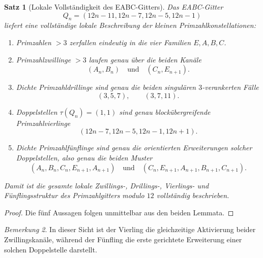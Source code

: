 \documentclass[11pt,a4paper]{article}
\newtheorem{satz}{Satz}
\theoremstyle{definition}
\theoremstyle{remark}
\newtheorem{bemerkung}[satz]{Bemerkung}
\begin{document}
	\begin{satz}[Lokale Vollständigkeit des EABC-Gitters]
		Das EABC-Gitter
		\[
		Q_n=(12n-11,12n-7,12n-5,12n-1)
		\]
		liefert eine vollständige lokale Beschreibung der kleinen Primzahlkonstellationen:
		
		\begin{enumerate}[label=\textup{(\roman*)}]
			\item Primzahlen \(>3\) zerfallen eindeutig in die vier Familien \(E,A,B,C\).
			\item Primzahlzwillinge \(>3\) laufen genau über die beiden Kanäle
			\[
			(A_n,B_n)\quad\text{und}\quad(C_n,E_{n+1}).
			\]
			\item Dichte Primzahldrillinge sind genau die beiden singulären \(3\)-verankerten Fälle
			\[
			(3,5,7),\qquad (3,7,11).
			\]
			\item Doppelstellen \(\tau(Q_n)=(1,1)\) sind genau blockübergreifende Primzahlvierlinge
			\[
			(12n-7,12n-5,12n-1,12n+1).
			\]
			\item Dichte Primzahlfünflinge sind genau die orientierten Erweiterungen solcher Doppelstellen,
			also genau die beiden Muster
			\[
			(A_n,B_n,C_n,E_{n+1},A_{n+1})
			\quad\text{und}\quad
			(C_n,E_{n+1},A_{n+1},B_{n+1},C_{n+1}).
			\]
		\end{enumerate}
		
		Damit ist die gesamte lokale Zwillings-, Drillings-, Vierlings- und Fünflingsstruktur
		des Primzahlgitters modulo \(12\) vollständig beschrieben.
	\end{satz}
	
	\begin{proof}
		Die fünf Aussagen folgen unmittelbar aus den beiden Lemmata.
	\end{proof}
	
	\begin{bemerkung}
		In dieser Sicht ist der Vierling die gleichzeitige Aktivierung beider Zwillingskanäle,
		während der Fünfling die erste gerichtete Erweiterung einer solchen Doppelstelle darstellt.
	\end{bemerkung}
	
\end{document}
